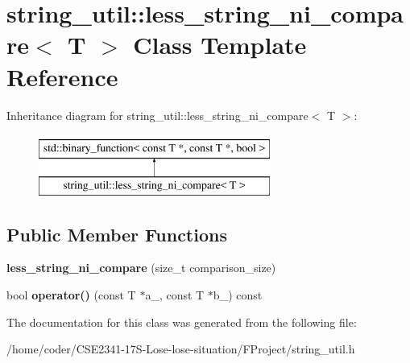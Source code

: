 \section{string\+\_\+util\+:\+:less\+\_\+string\+\_\+ni\+\_\+compare$<$ T $>$ Class Template Reference}
\label{classstring__util_1_1less__string__ni__compare}
Inheritance diagram for string\+\_\+util\+:\+:less\+\_\+string\+\_\+ni\+\_\+compare$<$ T $>$\+:\begin{figure}[H]
\begin{center}
\leavevmode
\includegraphics[height=2.000000cm]{classstring__util_1_1less__string__ni__compare}
\end{center}
\end{figure}
\subsection*{Public Member Functions}
\begin{DoxyCompactItemize}
\item 
{\bfseries less\+\_\+string\+\_\+ni\+\_\+compare} (size\+\_\+t comparison\+\_\+size)\label{classstring__util_1_1less__string__ni__compare_aec49bc79089ab2e54ff4752bbbabe6bf}

\item 
bool {\bfseries operator()} (const T $\ast$a\+\_\+, const T $\ast$b\+\_\+) const \label{classstring__util_1_1less__string__ni__compare_a6050f7d7b4998343cc5c46dca8b28bcc}

\end{DoxyCompactItemize}


The documentation for this class was generated from the following file\+:\begin{DoxyCompactItemize}
\item 
/home/coder/\+C\+S\+E2341-\/17\+S-\/\+Lose-\/lose-\/situation/\+F\+Project/string\+\_\+util.\+h\end{DoxyCompactItemize}
